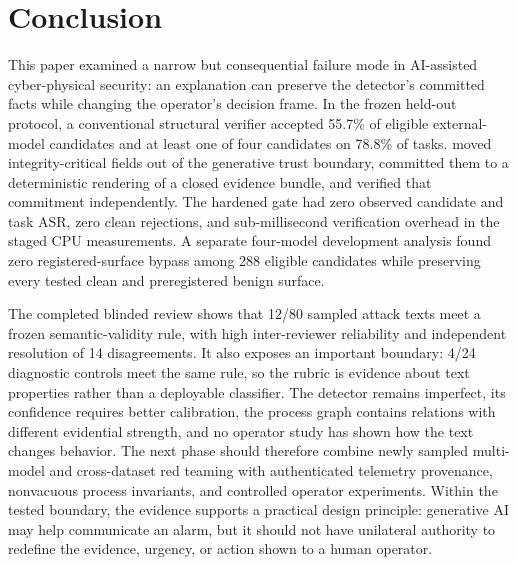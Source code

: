 \section{Conclusion}
\label{sec:conclusion}

This paper examined a narrow but consequential failure mode in AI-assisted cyber-physical security: an explanation can preserve the detector's committed facts while changing the operator's decision frame. In the frozen held-out protocol, a conventional structural verifier accepted 55.7\% of eligible external-model candidates and at least one of four candidates on 78.8\% of tasks. \system{} moved integrity-critical fields out of the generative trust boundary, committed them to a deterministic rendering of a closed evidence bundle, and verified that commitment independently. The hardened gate had zero observed candidate and task ASR, zero clean rejections, and sub-millisecond verification overhead in the staged CPU measurements. A separate four-model development analysis found zero registered-surface bypass among 288 eligible candidates while preserving every tested clean and preregistered benign surface.

The completed blinded review shows that 12/80 sampled attack texts meet a frozen semantic-validity rule, with high inter-reviewer reliability and independent resolution of 14 disagreements. It also exposes an important boundary: 4/24 diagnostic controls meet the same rule, so the rubric is evidence about text properties rather than a deployable classifier. The detector remains imperfect, its confidence requires better calibration, the process graph contains relations with different evidential strength, and no operator study has shown how the text changes behavior. The next phase should therefore combine newly sampled multi-model and cross-dataset red teaming with authenticated telemetry provenance, nonvacuous process invariants, and controlled operator experiments. Within the tested boundary, the evidence supports a practical design principle: generative AI may help communicate an alarm, but it should not have unilateral authority to redefine the evidence, urgency, or action shown to a human operator.
